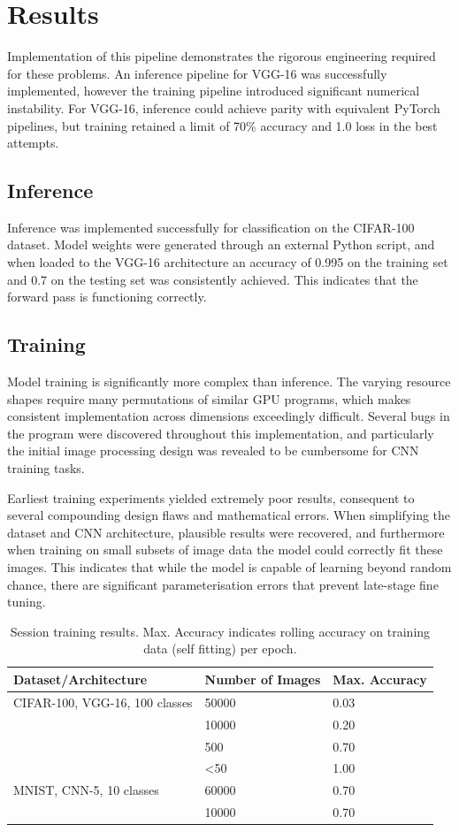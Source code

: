 \documentclass[10pt, a4paper]{article}
\begin{document}
\section{Results}

Implementation of this pipeline demonstrates the rigorous engineering required for these problems. An inference pipeline for VGG-16 was successfully implemented, however the training pipeline introduced significant numerical instability. For VGG-16, inference could achieve parity with equivalent PyTorch pipelines, but training retained a limit of 70\% accuracy and 1.0 loss in the best attempts.

\subsection{Inference}
Inference was implemented successfully for classification on the CIFAR-100 dataset. Model weights were generated through an external Python script, and when loaded to the VGG-16 architecture an accuracy of 0.995 on the training set and 0.7 on the testing set was consistently achieved. This indicates that the forward pass is functioning correctly.

\subsection{Training}
Model training is significantly more complex than inference. The varying resource shapes require many permutations of similar GPU programs, which makes consistent implementation across dimensions exceedingly difficult. Several bugs in the program were discovered throughout this implementation, and particularly the initial image processing design was revealed to be cumbersome for CNN training tasks. 

Earliest training experiments yielded extremely poor results, consequent to several compounding design flaws and mathematical errors. When simplifying the dataset and CNN architecture, plausible results were recovered, and furthermore when training on small subsets of image data the model could correctly fit these images. This indicates that while the model is capable of learning beyond random chance, there are significant parameterisation errors that prevent late-stage fine tuning. 

\begin{table}[H]
\centering
\begin{tabular}{|l|l|l|}
	\hline
	\textbf{Dataset/Architecture} & \textbf{Number of Images} & \textbf{Max. Accuracy}\\
    \hline
    CIFAR-100, VGG-16, 100 classes & 50000 & 0.03\\
    & 10000 & 0.20\\
    & 500 & 0.70\\
    & <50 & 1.00\\
    \hline
    MNIST, CNN-5, 10 classes & 60000 & 0.70\\
    & 10000 & 0.70\\
    \hline
\end{tabular}
\caption{Session training results. Max. Accuracy indicates rolling accuracy on training data (self fitting) per epoch. }
\end{table}
\end{document}

